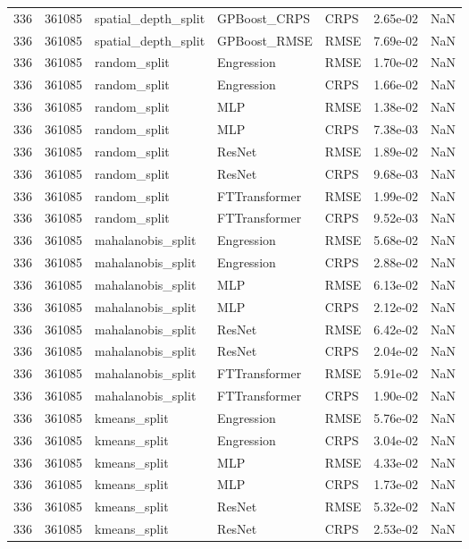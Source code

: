 \begin{tabular}{rrlllrr}
336 & 361085 & spatial\_depth\_split & GPBoost\_CRPS & CRPS & 2.65e-02 & NaN \\
336 & 361085 & spatial\_depth\_split & GPBoost\_RMSE & RMSE & 7.69e-02 & NaN \\
336 & 361085 & random\_split & Engression & RMSE & 1.70e-02 & NaN \\
336 & 361085 & random\_split & Engression & CRPS & 1.66e-02 & NaN \\
336 & 361085 & random\_split & MLP & RMSE & 1.38e-02 & NaN \\
336 & 361085 & random\_split & MLP & CRPS & 7.38e-03 & NaN \\
336 & 361085 & random\_split & ResNet & RMSE & 1.89e-02 & NaN \\
336 & 361085 & random\_split & ResNet & CRPS & 9.68e-03 & NaN \\
336 & 361085 & random\_split & FTTransformer & RMSE & 1.99e-02 & NaN \\
336 & 361085 & random\_split & FTTransformer & CRPS & 9.52e-03 & NaN \\
336 & 361085 & mahalanobis\_split & Engression & RMSE & 5.68e-02 & NaN \\
336 & 361085 & mahalanobis\_split & Engression & CRPS & 2.88e-02 & NaN \\
336 & 361085 & mahalanobis\_split & MLP & RMSE & 6.13e-02 & NaN \\
336 & 361085 & mahalanobis\_split & MLP & CRPS & 2.12e-02 & NaN \\
336 & 361085 & mahalanobis\_split & ResNet & RMSE & 6.42e-02 & NaN \\
336 & 361085 & mahalanobis\_split & ResNet & CRPS & 2.04e-02 & NaN \\
336 & 361085 & mahalanobis\_split & FTTransformer & RMSE & 5.91e-02 & NaN \\
336 & 361085 & mahalanobis\_split & FTTransformer & CRPS & 1.90e-02 & NaN \\
336 & 361085 & kmeans\_split & Engression & RMSE & 5.76e-02 & NaN \\
336 & 361085 & kmeans\_split & Engression & CRPS & 3.04e-02 & NaN \\
336 & 361085 & kmeans\_split & MLP & RMSE & 4.33e-02 & NaN \\
336 & 361085 & kmeans\_split & MLP & CRPS & 1.73e-02 & NaN \\
336 & 361085 & kmeans\_split & ResNet & RMSE & 5.32e-02 & NaN \\
336 & 361085 & kmeans\_split & ResNet & CRPS & 2.53e-02 & NaN \\

\end{tabular}
